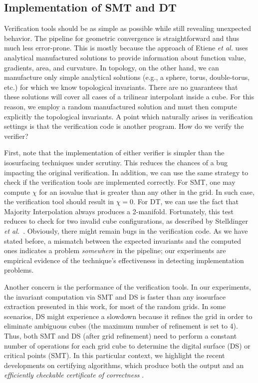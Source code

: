 \subsection{Implementation of SMT and DT}
Verification tools should be as simple as possible while still
revealing unexpected behavior. The pipeline for geometric
convergence is straightforward and thus much less error-prone. This is
mostly because the approach of Etiene \emph{et al.} uses analytical manufactured solutions to provide
information about function value, gradients, area, and curvature. In topology,
on the other hand, we can manufacture only simple analytical solutions (e.g., a
sphere, torus, double-torus, etc.) for which we know topological
invariants. There are no guarantees that these solutions will cover all
cases of a trilinear interpolant inside a cube. For this reason, we
employ a random manufactured solution and must then compute
explicitly the topological invariants.
A point which naturally arises in verification settings is that the verification code is another program. 
How do we verify the verifier?

First, note that the implementation of either verifier is simpler than
the isosurfacing techniques under scrutiny. This reduces the chances
of a bug impacting the original verification.  In addition, we can use
the same strategy to check if the verification tools are implemented
correctly. For SMT, one may compute $\chi$ for an isovalue that is
greater than any other in the grid. In such case, the verification
tool should result in $\chi = 0$. For DT, we can use the fact that
Majority Interpolation always produces a 2-manifold. Fortunately, this
test reduces to check for two invalid cube configurations, as described
by Stelldinger \emph{et al.}~\cite{siqueira:2007}. Obviously, there might
remain bugs in the verification code. As we have stated before, a
mismatch between the expected invariants and the computed ones
indicates a problem \emph{somewhere} in the pipeline; our experiments
are empirical evidence of the technique's effectiveness in detecting
implementation problems.

Another concern is the performance of the verification tools. In our
experiments, the invariant computation via SMT and DS is faster than
any isosurface extraction presented in this work, for most of the
random grids. In some scenarios, DS might experience a slowdown
because it refines the grid in order to eliminate ambiguous cubes (the
maximum number of refinement is set to 4). Thus, both SMT and DS (after
grid refinement) need to perform a constant number of operations
for each grid cube to determine the digital surface (DS) or critical
points (SMT).  In this particular context, we highlight the recent
developments on certifying algorithms, which produce both the
output and an \emph{efficiently checkable certificate of
  correctness} \cite{McConnell:2010:CA}.


